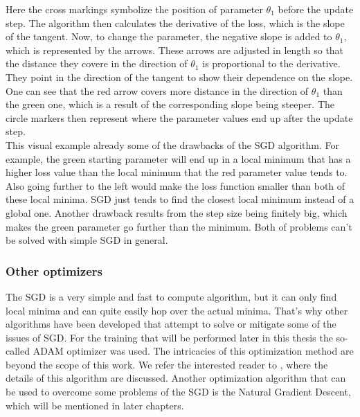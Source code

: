 Here the cross markings symbolize the position of parameter $\theta_1$ before the update step. The algorithm then calculates the derivative of the loss, which is the slope of the tangent. Now, to change the parameter, the negative slope is added to $\theta_1$, which is represented by the arrows. These arrows are adjusted in length so that the distance they covere in the direction of $\theta_1$ is proportional to the derivative. They point in the direction of the tangent to show their dependence on the slope. One can see that the red arrow covers more distance in the direction of $\theta_1$ than the green one, which is a result of the corresponding slope being steeper. The circle markers then represent where the parameter values end up after the update step.\\
This visual example already some of the drawbacks of the SGD algorithm. For example, the green starting parameter will end up in a local minimum that has a higher loss value than the local minimum that the red parameter value tends to. Also going further to the left would make the loss function smaller than both of these local minima. SGD just tends to find the closest local minimum instead of a global one. Another drawback results from the step size being finitely big, which makes the green parameter go further than the minimum. Both of problems can't be solved with simple SGD in general.

\subsubsection{Other optimizers}
The SGD is a very simple and fast to compute algorithm, but it can only find local minima and can quite easily hop over the actual minima. That's why other algorithms have been developed that attempt to solve or mitigate some of the issues of SGD. For the training that will be performed later in this thesis the so-called ADAM optimizer was used. The intricacies of this optimization method are beyond the scope of this work. We refer the interested reader to \cite{adamPaper}, where the details of this algorithm are discussed. Another optimization algorithm that can be used to overcome some problems of the SGD is the Natural Gradient Descent, which will be mentioned in later chapters.


